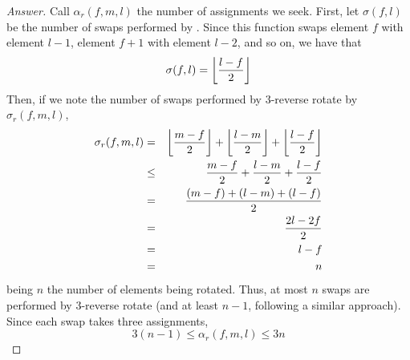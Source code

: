 \begin{proof}[Answer]
Call $\alpha_r(f,m,l)$ the number of assignments we seek.
First, let $\sigma(f,l)$ be the number of swaps performed by . Since this
function swaps element $f$ with element $l-1$, element $f+1$ with element
$l-2$, and so on, we have that 
$$\sigma(f, l) = \left\lfloor \frac{l-f}{2} \right\rfloor$$
Then, if we note the number of swaps performed by 3-reverse rotate by 
$\sigma_r(f,m,l)$,
\begin{eqnarray*}
\sigma_r(f,m,l) &=& \left\lfloor \frac{m-f}{2} \right\rfloor + \left\lfloor \frac{l-m}{2} \right\rfloor + 
                    \left\lfloor \frac{l-f}{2} \right\rfloor \\
             &\leq& \frac{m-f}{2} + \frac{l-m}{2} + \frac{l-f}{2} \\
                &=& \frac{(m-f) + (l-m) + (l-f)}{2} \\ 
                &=& \frac{2l - 2f}{2} \\
                &=& l - f \\
                &=& n
\end{eqnarray*}
being $n$ the number of elements being rotated. Thus, at most $n$ swaps are 
performed by 3-reverse rotate (and at least $n-1$, following a similar
approach). Since each swap takes three assignments,
$$3(n-1) \leq \alpha_r(f,m,l) \leq 3n$$
\end{proof}
